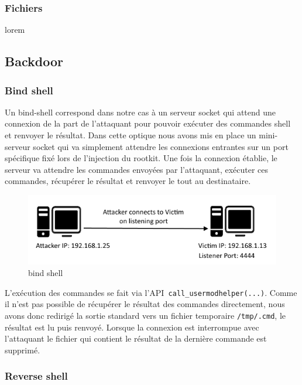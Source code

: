 \documentclass[11pt]{article}
\begin{document}
		\subsubsection{Fichiers}
			lorem
			
	\subsection{Backdoor}
	
		\subsubsection{Bind shell}
			
			Un bind-shell correspond dans notre cas à un serveur socket qui attend une connexion de la part de l'attaquant pour pouvoir exécuter des commandes shell et renvoyer le résultat. Dans cette optique nous avons mis en place un mini-serveur socket qui va simplement attendre les connexions entrantes sur un port spécifique fixé lors de l'injection du rootkit. Une fois la connexion établie, le serveur va attendre les commandes envoyées par l'attaquant, exécuter ces commandes, récupérer le résultat et renvoyer le tout au destinataire. 
			
\begin{figure}[ht!]	
\begin{center}
\includegraphics{./img/bind-shell.png}

\caption[dsfsdf]{bind shell}
\end{center}
\end{figure}
			
			L'exécution des commandes se fait via l'API\texttt{ call\_usermodhelper(...)}. Comme il n'est pas possible de récupérer le résultat des commandes directement, nous avons donc redirigé la sortie standard vers un fichier temporaire \texttt{/tmp/.cmd}, le résultat est lu puis renvoyé. Lorsque la connexion est interrompue avec l'attaquant le fichier qui contient le résultat de la dernière commande est supprimé.
			
		\subsubsection{Reverse shell}
			
\end{document}
